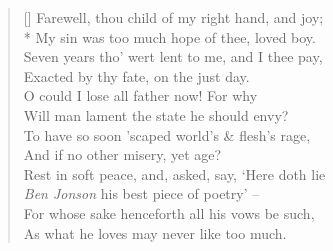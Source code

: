 \documentclass[MAIN]{subfiles}
\begin{document}
\settowidth{\versewidth}{Farewell, thou child of my right hand, and joy;}
\begin{verse}[\versewidth]
Farewell, thou child of my right hand, and joy;\\*
My sin was too much hope of thee, loved boy.\\
Seven years tho' wert lent to me, and I thee pay,\\
Exacted by thy fate, on the just day.\\
O could I lose all father now! For why\\
Will man lament the state he should envy?\\
To have so soon 'scaped world's \& flesh's rage,\\
And if no other misery, yet age?\\
Rest in soft peace, and, asked, say, `Here doth lie\\
\emph{Ben Jonson} his best piece of poetry' --\\
For whose sake henceforth all his vows be such,\\
As what he loves may never like too much.
\end{verse}
\end{document}
